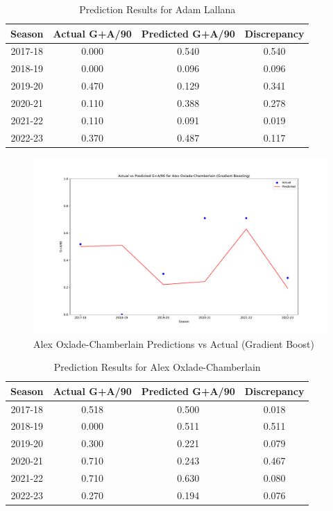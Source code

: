 \documentclass[12pt]{article}
\begin{document}

\begin{table}[H]
  \centering
  \begin{tabular}{|c|c|c|c|}
  \hline
  \textbf{Season} & \textbf{Actual G+A/90} & \textbf{Predicted G+A/90} & \textbf{Discrepancy} \\
  \hline
  2017-18 & 0.000 & 0.540 & 0.540 \\
  2018-19 & 0.000 & 0.096 & 0.096 \\
  2019-20 & 0.470 & 0.129 & 0.341 \\
  2020-21 & 0.110 & 0.388 & 0.278 \\
  2021-22 & 0.110 & 0.091 & 0.019 \\
  2022-23 & 0.370 & 0.487 & 0.117 \\
  \hline
  \end{tabular}
  \caption{Prediction Results for Adam Lallana}
  \label{tab:lallana_prediction_results}
\end{table}


\begin{figure}[H]
  \centering
  \includegraphics[width=1\textwidth]{GradBoost_Chamberlain.pdf}
  \caption{Alex Oxlade-Chamberlain Predictions vs Actual (Gradient Boost)}
  \label{fig:Chamberlain_graph}
  \end{figure}


\begin{table}[H]
  \centering
  \begin{tabular}{|c|c|c|c|}
  \hline
  \textbf{Season} & \textbf{Actual G+A/90} & \textbf{Predicted G+A/90} & \textbf{Discrepancy} \\
  \hline
  2017-18 & 0.518 & 0.500 & 0.018 \\
  2018-19 & 0.000 & 0.511 & 0.511 \\
  2019-20 & 0.300 & 0.221 & 0.079 \\
  2020-21 & 0.710 & 0.243 & 0.467 \\
  2021-22 & 0.710 & 0.630 & 0.080 \\
  2022-23 & 0.270 & 0.194 & 0.076 \\
  \hline
  \end{tabular}
  \caption{Prediction Results for Alex Oxlade-Chamberlain}
  \label{tab:oxlade_chamberlain_prediction_results}
\end{table}
\end{document}
